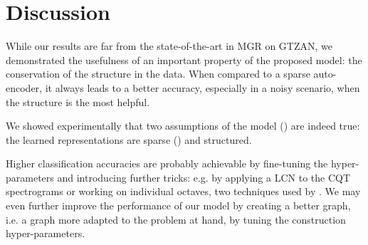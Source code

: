 

\section{Discussion}

While our results are far from the state-of-the-art in \gls{MGR} on GTZAN, we demonstrated the usefulness of an important property of the proposed model: the conservation of the structure in the data. When compared to a sparse auto-encoder, it always leads to a better accuracy, especially in a noisy scenario, when the structure is the most helpful.

We showed experimentally that two assumptions of the model () are indeed true: the learned representations are sparse () and structured.

Higher classification accuracies are probably achievable by fine-tuning the hyper-parameters and introducing further tricks: e.g. by applying a \gls{LCN} to the \gls{CQT} spectrograms or working on individual octaves, two techniques used by \cite{lecun2011PSDaudio}. We may even further improve the performance of our model by creating a better graph, i.e. a graph more adapted to the problem at hand, by tuning the construction hyper-parameters.